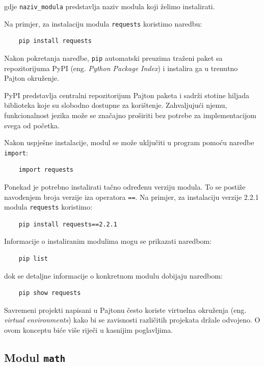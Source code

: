 gdje \texttt{naziv\_modula} predstavlja naziv modula koji želimo instalirati.

Na primjer, za instalaciju modula \texttt{requests} koristimo naredbu:

\begin{verbatim}
	pip install requests
\end{verbatim}

Nakon pokretanja naredbe, \texttt{pip} automatski preuzima traženi paket sa repozitorijuma PyPI (eng. \emph{Python Package Index}) i instalira ga u trenutno Pajton okruženje.

PyPI predstavlja centralni repozitorijum Pajton paketa i sadrži stotine hiljada biblioteka koje su slobodno dostupne za korištenje. Zahvaljujući njemu, funkcionalnost jezika može se značajno proširiti bez potrebe za implementacijom svega od početka.

Nakon uspješne instalacije, modul se može uključiti u program pomoću naredbe \texttt{import}:

\begin{verbatim}
	import requests
\end{verbatim}

Ponekad je potrebno instalirati tačno određenu verziju modula. To se postiže navođenjem broja verzije iza operatora \texttt{==}. Na primjer, za instalaciju verzije 2.2.1 modula \texttt{requests} koristimo:

\begin{verbatim}
	pip install requests==2.2.1
\end{verbatim}

Informacije o instaliranim modulima mogu se prikazati naredbom:
\begin{verbatim}
	pip list
\end{verbatim}

dok se detaljne informacije o konkretnom modulu dobijaju naredbom:

\begin{verbatim}
	pip show requests
\end{verbatim}

Savremeni projekti napisani u Pajtonu često koriste virtuelna okruženja (eng. \emph{virtual environments}) kako bi se zavisnosti različitih projekata držale odvojeno. O ovom konceptu biće više riječi u kasnijim poglavljima.

\subsection{Modul \texttt{math}}

